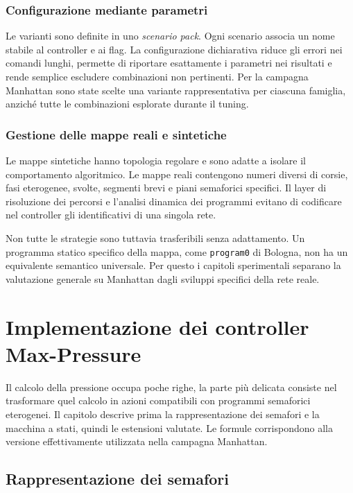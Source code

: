 \documentclass[12pt,a4paper,oneside]{report}
\numberwithin{equation}{chapter}
\begin{document}
\subsection{Configurazione mediante parametri}

Le varianti sono definite in uno \emph{scenario pack}. Ogni scenario associa
un nome stabile al controller e ai flag. La configurazione dichiarativa riduce
gli errori nei comandi lunghi, permette di riportare esattamente i parametri
nei risultati e rende semplice escludere combinazioni non pertinenti. Per la
campagna Manhattan sono state scelte una variante rappresentativa per ciascuna
famiglia, anziché tutte le combinazioni esplorate durante il tuning.

\subsection{Gestione delle mappe reali e sintetiche}

Le mappe sintetiche hanno topologia regolare e sono adatte a isolare il
comportamento algoritmico. Le mappe reali contengono numeri diversi di corsie,
fasi eterogenee, svolte, segmenti brevi e piani semaforici specifici. Il layer
di risoluzione dei percorsi e l'analisi dinamica dei programmi evitano di
codificare nel controller gli identificativi di una singola rete.

Non tutte le strategie sono tuttavia trasferibili senza adattamento. Un
programma statico specifico della mappa, come \texttt{program0} di Bologna, non ha un
equivalente semantico universale. Per questo i capitoli sperimentali separano
la valutazione generale su Manhattan dagli sviluppi specifici della rete
reale.

\chapter{Implementazione dei controller Max-Pressure}
\label{chap:implementazione}

Il calcolo della pressione occupa poche righe, la parte più delicata consiste
nel trasformare quel calcolo in azioni compatibili con programmi semaforici
eterogenei. Il capitolo descrive prima la rappresentazione dei semafori e la
macchina a stati, quindi le estensioni valutate. Le formule corrispondono alla
versione effettivamente utilizzata nella campagna Manhattan.

\section{Rappresentazione dei semafori}
\end{document}
